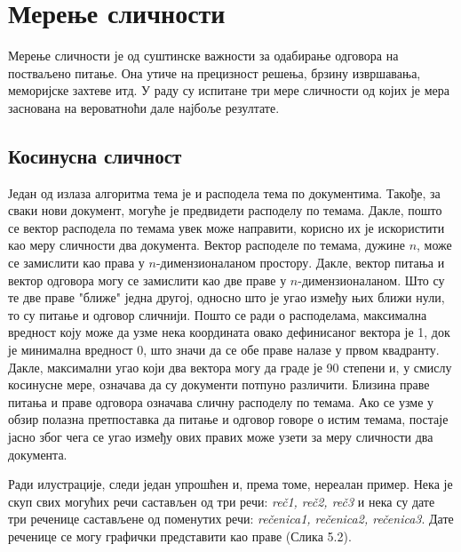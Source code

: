 \section{Мерење сличности}

Мерење сличности је од суштинске важности за одабирање одговора на постваљено питање. Она утиче на прецизност решења, брзину извршавања, меморијске захтеве итд. У раду су испитане три мере сличности од којих је мера заснована на вероватноћи дале најбоље резултате.


\subsection{Косинусна сличност}

Један од излаза алгоритма тема је и расподела тема по документима. Такође, за сваки нови документ, могуће је предвидети расподелу по темама. Дакле, пошто се вектор расподела по темама увек може направити, корисно их је искористити као меру сличности два документа.
Вектор расподеле по темама, дужине $n$, може се замислити  као права у $n$-димензионаланом простору. Дакле, вектор питања и вектор одговора могу се замислити као две праве у $n$-димензионаланом. Што су те две праве "ближе" једна другој, односно што је угао између њих ближи нули, то су питање и одговор сличнији. 
Пошто се ради о расподелама, максимална вредност коју може да узме нека координата овако дефинисаног вектора је 1, док је минимална вредност 0, што значи да се обе праве налазе у првом квадранту. Дакле, максимални угао који два вектора могу да граде је 90 степени и, у смислу косинусне мере, означава да су документи потпуно различити.
Близина праве питања и праве одговора означава сличну расподелу по темама. Ако се узме у обзир полазна претпоставка да питање и одговор говоре о истим темама, постаје јасно због чега се угао између ових правих може узети за меру сличности два документа.

Ради илустрације, следи један упрошћен и, према томе, нереалан пример. 
Нека је скуп свих могућих речи састављен од три речи: \textit{reč1, reč2, reč3} и нека су дате три реченице састављене од поменутих речи: \textit{rečenica1, rečenica2, rečenica3}. Дате реченице се могу графички представити као праве (Слика 5.2).

